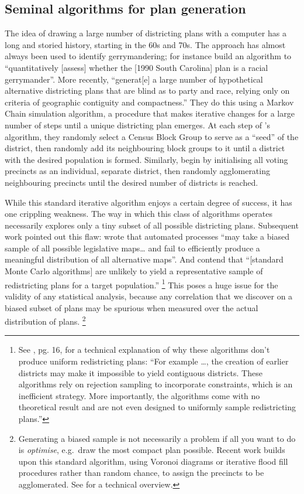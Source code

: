 \documentclass[]{article}
\begin{document}
\hypertarget{seminal-algorithms-for-plan-generation}{%
\subsection{Seminal algorithms for plan
generation}\label{seminal-algorithms-for-plan-generation}}

The idea of drawing a large number of districting plans with a computer
has a long and storied history, starting in the 60s and 70s. The
approach has almost always been used to identify gerrymandering; for
instance \cite{ccd2000} build an algorithm to ``quantitatively
{[}assess{]} whether the {[}1990 South Carolina{]} plan is a racial
gerrymander''. More recently, \cite{cr2013} ``generat{[}e{]} a large
number of hypothetical alternative districting plans that are blind as
to party and race, relying only on criteria of geographic contiguity and
compactness.'' They do this using a Markov Chain simulation algorithm, a
procedure that makes iterative changes for a large number of steps until
a unique districting plan emerges. At each step of
\citeauthor{ccd2000}'s algorithm, they randomly select a Census Block
Group to serve as a ``seed'' of the district, then randomly add its
neighbouring block groups to it until a district with the desired
population is formed. Similarly, \citeauthor{cr2013} begin by
initialising all voting precincts as an individual, separate district,
then randomly agglomerating neighbouring precincts until the desired
number of districts is reached.

While this standard iterative algorithm enjoys a certain degree of
success, it has one crippling weakness. The way in which this class of
algorithms operates necessarily explores only a tiny subset of all
possible districting plans. Subsequent work pointed out this flaw:
\citeauthor{mm2018} wrote that automated processes ``may take a biased
sample of all possible legislative maps\ldots{} and fail to efficiently
produce a meaningful distribution of all alternative maps''. And
\citeauthor{fifieldwp} contend that ``{[}standard Monte Carlo
algorithms{]} are unlikely to yield a representative sample of
redistricting plans for a target population.'' \footnote{See
  \cite{fifieldwp}, pg. 16, for a technical explanation of why these
  algorithms don't produce uniform redistricting plans: ``For example
  \ldots{}, the creation of earlier districts may make it impossible to
  yield contiguous districts. These algorithms rely on rejection
  sampling to incorporate constraints, which is an inefficient strategy.
  More importantly, the algorithms come with no theoretical result and
  are not even designed to uniformly sample redistricting plans.''} This
poses a huge issue for the validity of any statistical analysis, because
any correlation that we discover on a biased subset of plans may be
spurious when measured over the actual distribution of plans. \footnote{Generating
  a biased sample is not necessarily a problem if all you want to do is
  \emph{optimise}, e.g.~draw the most compact plan possible. Recent work
  builds upon this standard algorithm, using Voronoi diagrams or
  iterative flood fill procedures rather than random chance, to assign
  the precincts to be agglomerated. See \cite{lf2019} for a technical
  overview.}
\end{document}
